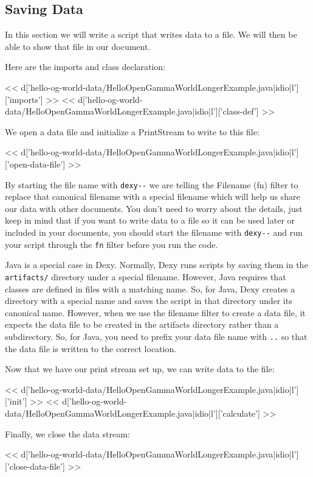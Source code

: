 \subsection{Saving Data}

In this section we will write a script that writes data to a file. We will then
be able to show that file in our document.

Here are the imports and class declaration:

<< d['hello-og-world-data/HelloOpenGammaWorldLongerExample.java|idio|l']['imports'] >>
<< d['hello-og-world-data/HelloOpenGammaWorldLongerExample.java|idio|l']['class-def'] >>

We open a data file and initialize a PrintStream to write to this file:

<< d['hello-og-world-data/HelloOpenGammaWorldLongerExample.java|idio|l']['open-data-file'] >>

By starting the file name with \verb|dexy--| we are telling the Filename (fn)
filter to replace that canonical filename with a special filename which will
help us share our data with other documents. You don't need to worry about the
details, just keep in mind that if you want to write data to a file so it can
be used later or included in your documents, you should start the filename with
\verb|dexy--| and run your script through the \verb|fn| filter before you run
the code.

Java is a special case in Dexy. Normally, Dexy runs scripts by saving them in
the \verb|artifacts/| directory under a special filename. However, Java
requires that classes are defined in files with a matching name. So, for Java,
Dexy creates a directory with a special name and saves the script in that
directory under its canonical name. However, when we use the filename filter to
create a data file, it expects the data file to be created in the artifacts
directory rather than a subdirectory. So, for Java, you need to prefix your
data file name with \verb|..| so that the data file is written to the correct
location.

Now that we have our print stream set up, we can write data to the file:

<< d['hello-og-world-data/HelloOpenGammaWorldLongerExample.java|idio|l']['init'] >>
<< d['hello-og-world-data/HelloOpenGammaWorldLongerExample.java|idio|l']['calculate'] >>

Finally, we close the data stream:

<< d['hello-og-world-data/HelloOpenGammaWorldLongerExample.java|idio|l']['close-data-file'] >>

